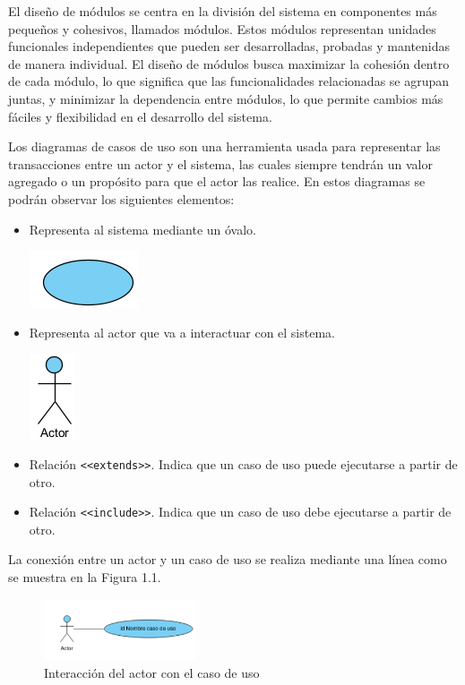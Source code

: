 El diseño de módulos se centra en la división del sistema en componentes más pequeños y cohesivos, llamados módulos. Estos módulos representan unidades funcionales independientes que pueden ser desarrolladas, probadas y mantenidas de manera individual. El diseño de módulos busca maximizar la cohesión dentro de cada módulo, lo que significa que las funcionalidades relacionadas se agrupan juntas, y minimizar la dependencia entre módulos, lo que permite cambios más fáciles y flexibilidad en el desarrollo del sistema.


Los diagramas de casos de uso son una herramienta usada para representar las transacciones entre un actor y el sistema, las cuales siempre tendrán un valor agregado o un propósito para que el actor las realice. En estos diagramas se podrán observar los siguientes elementos:

\begin{itemize}
    \item Representa al sistema mediante un óvalo.
    \begin{minipage}{0.2\textwidth}
        \includegraphics[width=0.1\linewidth]{images/ovalo.png}
    \end{minipage}
    \item Representa al actor que va a interactuar con el sistema.
    \begin{minipage}{0.2\textwidth}
        \includegraphics[width=0.1\linewidth]{images/actor.png}
    \end{minipage}
    \item Relación \texttt{<<extends>>}. Indica que un caso de uso puede ejecutarse a partir de otro.
    \item Relación \texttt{<<include>>}. Indica que un caso de uso debe ejecutarse a partir de otro.
\end{itemize}

La conexión entre un actor y un caso de uso se realiza mediante una línea como se muestra en la Figura 1.1.

\begin{figure}[htbp]
    \centering
    \includegraphics[width=0.4\textwidth]{images/interaccion.png}
    \caption{Interacción del actor con el caso de uso}
    \label{fig:interaccion-actor-caso-uso}
\end{figure}

